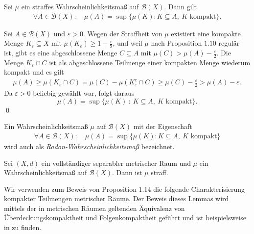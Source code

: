 \begin{corollary}
    Sei $\mu$ ein straffes Wahrscheinlichkeitsmaß auf $\mathcal{B}(X)$. Dann gilt
    \begin{align*}
        \forall A \in \mathcal{B}(X): \quad \mu(A) = \sup\{\mu(K): K \subseteq A,\ K \text{ kompakt}\}. 
    \end{align*}
\end{corollary}

\begin{proof*}
    Sei $A \in \mathcal{B}(X)$ und $\varepsilon > 0$. Wegen der Straffheit von $\mu$ existiert eine kompakte Menge $K_{\varepsilon} \subseteq X$ mit $\mu(K_{\varepsilon}) \geq 1 - \frac{\varepsilon}{2}$,
    und weil $\mu$ nach Proposition $1.10$ regulär ist, gibt es eine abgeschlossene Menge $C \subseteq A$ mit $\mu(C) > \mu(A) - \frac{\varepsilon}{2}$. 
    Die Menge $K_{\varepsilon} \cap C$ ist als abgeschlossene Teilmenge einer kompakten Menge wiederum kompakt und es gilt
    \begin{align*}
        \mu(A) \geq \mu(K_{\varepsilon} \cap C) = \mu(C) - \mu(K_{\varepsilon}^c \cap C) \geq \mu(C) - \frac{\varepsilon}{2} > \mu(A) - \varepsilon. 
    \end{align*} 
    Da $\varepsilon > 0$ beliebig gewählt war, folgt daraus 
    $$
        \mu(A) = \sup\{\mu(K) \ : \ K \subseteq A, \ K \text{ kompakt} \}. 
    $$\qed
\end{proof*}

\begin{remark}
    Ein Wahrscheinlichkeitsmaß $\mu$ auf $\mathcal{B}(X)$ mit der Eigenschaft
    \begin{align*}
        \forall A \in \mathcal{B}(X): \quad \mu(A) = \sup\{\mu(K): K \subseteq A, \ K \text{ kompakt}\}
    \end{align*}
    wird auch als \textit{Radon-Wahrscheinlichkeitsmaß} bezeichnet.
\end{remark}

\begin{proposition}
    Sei $(X,d)$ ein vollständiger separabler metrischer Raum und $\mu$ ein Wahrscheinlichkeitsmaß auf $\mathcal{B}(X)$. Dann ist $\mu$ straff.
\end{proposition}

Wir verwenden zum Beweis von Proposition $1.14$ die folgende Charakterisierung kompakter Teilmengen metrischer Räume. 
Der Beweis dieses Lemmas wird mittels der in metrischen Räumen geltenden Äquivalenz von Überdeckungskompaktheit und Folgenkompaktheit geführt und ist beispielsweise in \cite[Theorem III.3.10]{amann} zu finden. 

